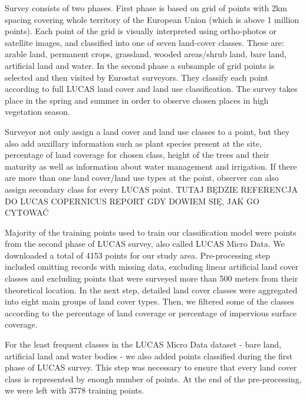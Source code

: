 \documentclass{amuthesis}
\begin{document}
Survey consists of two phases. First phase is based on grid of points
with 2km spacing covering whole territory of the European Union (which
is above 1 million points). Each point of the grid is visually
interpreted using ortho-photos or satellite images, and classified into
one of seven land-cover classes. These are: arable land, permanent
crops, grassland, wooded areas/shrub land, bare land, artificial land
and water. In the second phase a subsample of grid points is selected
and then visited by Eurostat surveyors. They classify each point
according to full LUCAS land cover and land use classification. The
survey takes place in the spring and summer in order to observe chosen
places in high vegetation season.

Surveyor not only assign a land cover and land use classes to a point,
but they also add auxillary information such as plant species present at
the site, percentage of land coverage for chosen class, height of the
trees and their maturity as well as information about water management
and irrigation. If there are more than one land cover/land use types at
the point, observer can also assign secondary class for every LUCAS
point. TUTAJ BĘDZIE REFERENCJA DO LUCAS COPERNICUS REPORT GDY DOWIEM
SIĘ, JAK GO CYTOWAĆ

Majority of the training points used to train our classification model
were points from the second phase of LUCAS survey, also called LUCAS
Micro Data. We downloaded a total of 4153 points for our study area.
Pre-processing step included omitting records with missing data,
excluding linear artificial land cover classes and excluding points that
were surveyed more than 500 meters from their theoretical location. In
the next step, detailed land cover classes were aggregated into eight
main groups of land cover types. Then, we filtered some of the classes
according to the percentage of land coverage or percentage of impervious
surface coverage.

For the least frequent classes in the LUCAS Micro Data dataset - bare
land, artificial land and water bodies - we also added points classified
during the first phase of LUCAS survey. This step was necessary to
ensure that every land cover class is represented by enough number of
points. At the end of the pre-processing, we were left with 3778
training points.
\end{document}
